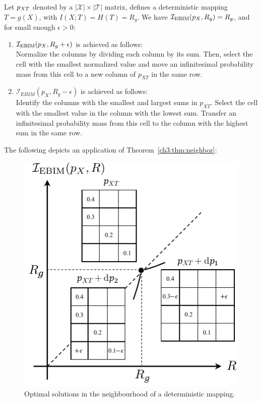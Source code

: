 \begin{theorem} \label{ch3:thm:neighbor}
Let $p_{XT}$ denoted by a $|\mathcal{X}| \times |\mathcal{T}|$ matrix, defines a deterministic mapping $T = g(X)$, with $ I(X;T)=H(T)=R_g $. We have $ \mathcal{I}_\text{EBIM}(p_X, R_g) = R_g $, and for small enough $ \epsilon > 0 $:
\begin{enumerate}
    \item $\mathcal{I}_\text{EBIM}(p_X, R_g + \epsilon)$ is achieved as follows:\\
    Normalize the columns by dividing each column by its sum. Then, select the cell with the smallest normalized value and move an infinitesimal probability mass from this cell to a new column of $p_{XT}$ in the same row.
    
    \item $\mathcal{I}_{EBIM}(p_X, R_g - \epsilon)$ is achieved as follows:\\
    Identify the columns with the smallest and largest sums in $p_{XT}$. Select the cell with the smallest value in the column with the lowest sum. Transfer an infinitesimal probability mass from this cell to the column with the highest sum in the same row.

\end{enumerate}
\end{theorem}

\begin{example}    
The following depicts an application of Theorem~\ref{ch3:thm:neighbor}:
\begin{figure}[h] 
    \centering
    \vspace{-5pt}
    \includegraphics[width=0.3\linewidth]{figs/ch3/didh2.pdf}
    \caption{Optimal solutions in the neighbourhood of a deterministic mapping.}\label{ch3:fig:didh} 
\end{figure}

\FloatBarrier
\end{example}


